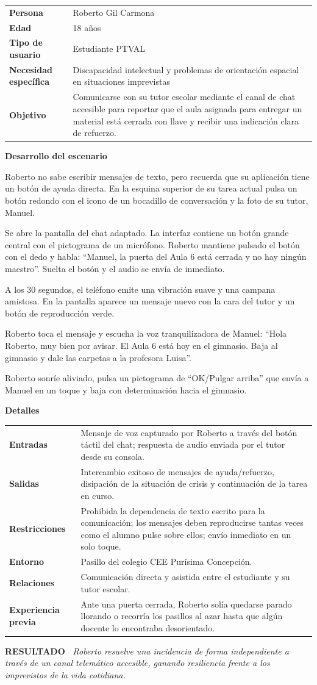 \documentclass[11pt,a4paper]{article}
\makeatletter
\newcommand{\escenariocard}[6]{%
\needspace{10\baselineskip}
\begin{tcolorbox}[breakable,enhanced,colback=white,colframe=brandgreen,boxrule=0.8pt,arc=3pt,
  left=9pt,right=9pt,top=7pt,bottom=7pt,before skip=10pt,after skip=10pt,
  title={\textbf{\color{white}ESCENARIO #1} \\[1pt] {\small\color{tintgreen}#2}},
  colbacktitle=brandgreen,coltitle=white,fonttitle=\bfseries,boxed title style={colframe=brandgreen}]
{\setlength{\parskip}{0pt}\renewcommand{\arraystretch}{1.35}\rowcolors{1}{tintgreen}{white}\arrayrulecolor{white}
\begin{tabular}{@{\hspace{4pt}}>{\bfseries\color{brandgreen}}p{3.4cm}p{11.4cm}@{}}
#3 \\
\end{tabular}}
\vspace{6pt}
\textbf{\color{brandblue}Desarrollo del escenario}\par\vspace{2pt}
#4
\par\vspace{4pt}
\textbf{\color{brandblue}Detalles}\par\vspace{2pt}
{\setlength{\parskip}{0pt}\renewcommand{\arraystretch}{1.35}\rowcolors{1}{tintblue}{white}\arrayrulecolor{white}
\begin{tabular}{@{\hspace{4pt}}>{\bfseries\color{brandblue}}p{3.4cm}p{11.4cm}@{}}
#5 \\
\end{tabular}}
\vspace{6pt}
\begin{tcolorbox}[colback=tintblue,colframe=brandblue,boxrule=0pt,sharp corners,borderline west={3pt}{0pt}{brandblue},left=8pt,right=8pt,top=5pt,bottom=5pt]
\textbf{\small\color{brandblue}RESULTADO\ } {\small\itshape #6}
\end{tcolorbox}
\end{tcolorbox}
}
\makeatother
\begin{document}
\escenariocard{8}{Resolución de un bloqueo en el taller mediante chat accesible con notas de voz}{%
Persona & Roberto Gil Carmona \\
Edad & 18 años \\
Tipo de usuario & Estudiante PTVAL \\
Necesidad específica & Discapacidad intelectual y problemas de orientación espacial en situaciones imprevistas \\
Objetivo & Comunicarse con su tutor escolar mediante el canal de chat accesible para reportar que el aula asignada para entregar un material está cerrada con llave y recibir una indicación clara de refuerzo.
}{%
Roberto no sabe escribir mensajes de texto, pero recuerda que su aplicación tiene un botón de ayuda directa. En la esquina superior de su tarea actual pulsa un botón redondo con el icono de un bocadillo de conversación y la foto de su tutor, Manuel.

Se abre la pantalla del chat adaptado. La interfaz contiene un botón grande central con el pictograma de un micrófono. Roberto mantiene pulsado el botón con el dedo y habla: ``Manuel, la puerta del Aula 6 está cerrada y no hay ningún maestro''. Suelta el botón y el audio se envía de inmediato.

A los 30 segundos, el teléfono emite una vibración suave y una campana amistosa. En la pantalla aparece un mensaje nuevo con la cara del tutor y un botón de reproducción verde.

Roberto toca el mensaje y escucha la voz tranquilizadora de Manuel: ``Hola Roberto, muy bien por avisar. El Aula 6 está hoy en el gimnasio. Baja al gimnasio y dale las carpetas a la profesora Luisa''.

Roberto sonríe aliviado, pulsa un pictograma de ``OK/Pulgar arriba'' que envía a Manuel en un toque y baja con determinación hacia el gimnasio.
}{%
Entradas & Mensaje de voz capturado por Roberto a través del botón táctil del chat; respuesta de audio enviada por el tutor desde su consola. \\
Salidas & Intercambio exitoso de mensajes de ayuda/refuerzo, disipación de la situación de crisis y continuación de la tarea en curso. \\
Restricciones & Prohibida la dependencia de texto escrito para la comunicación; los mensajes deben reproducirse tantas veces como el alumno pulse sobre ellos; envío inmediato en un solo toque. \\
Entorno & Pasillo del colegio CEE Purísima Concepción. \\
Relaciones & Comunicación directa y asistida entre el estudiante y su tutor escolar. \\
Experiencia previa & Ante una puerta cerrada, Roberto solía quedarse parado llorando o recorría los pasillos al azar hasta que algún docente lo encontraba desorientado.
}{Roberto resuelve una incidencia de forma independiente a través de un canal telemático accesible, ganando resiliencia frente a los imprevistos de la vida cotidiana.}
\end{document}
